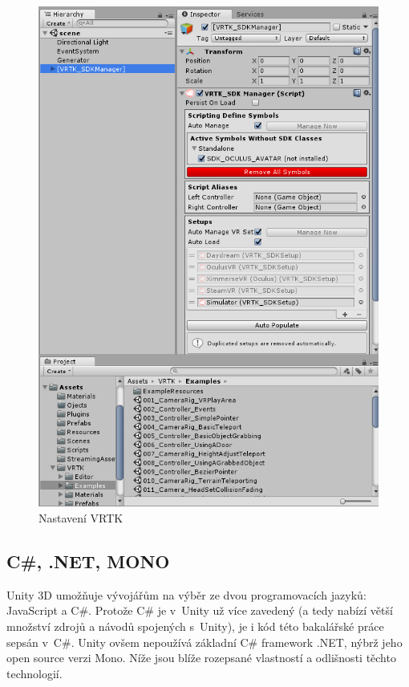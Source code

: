 \documentclass[thesis=B,czech]{FITthesis}[2012/06/26]
\begin{document}
	\begin{figure}
  		\includegraphics{VRTKsetup.png}
  		\caption{Nastavení VRTK}
  		\label{fig:VRTKsetup}
	\end{figure}
	
	\subsection{C\#, .NET, MONO}
	
	Unity 3D umožňuje vývojářům na výběr ze dvou programovacích jazyků: JavaScript a C\#. Protože C\# je v~Unity už více zavedený (a tedy nabízí větší množství zdrojů a návodů spojených s~Unity), je i kód této bakalářské práce sepsán v~C\#. Unity ovšem nepoužívá základní C\# framework .NET, nýbrž jeho open source verzi Mono. Níže jsou blíže rozepsané vlastností a odlišnosti těchto technologií.
	
\end{document}
